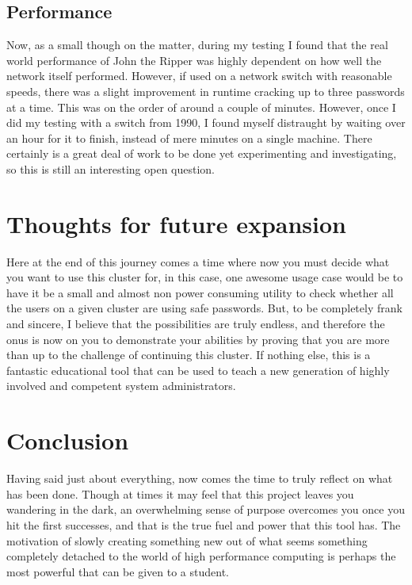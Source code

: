 \documentclass[]{article}
\begin{document}
            \subsection{Performance}
            Now, as a small though on the matter, during my testing I found that the real world performance of John the Ripper was highly dependent 
            on how well the network itself performed. However, if used on a network switch with reasonable speeds, there was a slight improvement 
            in runtime cracking up to three passwords at a time. This was on the order of around a couple of minutes. However, once I did my 
            testing with a switch from 1990, I found myself distraught by waiting over an hour for it to finish, instead of mere minutes on a 
            single machine. There certainly is a great deal of work to be done yet experimenting and investigating, so this is still an interesting
            open question.

            \section{Thoughts for future expansion}
            Here at the end of this journey comes a time where now you must decide what you want to use this cluster 
            for, in this case, one awesome usage case would be to have it be a small and almost non power consuming 
            utility to check whether all the users on a given cluster are using safe passwords. But, to be completely 
            frank and sincere, I believe that the possibilities are truly endless, and therefore the onus is now on you 
            to demonstrate your abilities by proving that you are more than up to the challenge of continuing this 
            cluster. If nothing else, this is a fantastic educational tool that can be used to teach a new generation 
            of highly involved and competent system administrators.

            \section{Conclusion}
            Having said just about everything, now comes the time to truly reflect on what has been done. Though at 
            times it may feel that this project leaves you wandering in the dark, an overwhelming sense of purpose 
            overcomes you once you hit the first successes, and that is the true fuel and power that this tool has. The 
            motivation of slowly creating something new out of what seems something completely detached to the world of 
            high performance computing is perhaps the most powerful that can be given to a student.
\end{document}
